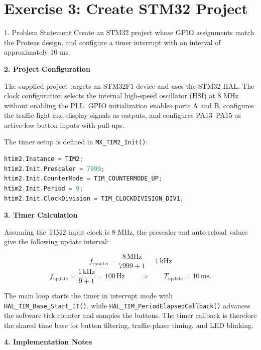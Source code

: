 \clearpage
\section*{Exercise 3: Create STM32 Project}

\begin{questionbox}{1. Problem Statement}
Create an STM32 project whose GPIO assignments match the Proteus design, and configure a timer interrupt with an interval of approximately 10 ms.
\end{questionbox}

\vspace{0.4cm}
\textbf{2. Project Configuration}

The supplied project targets an STM32F1 device and uses the STM32 HAL. The clock configuration selects the internal high-speed oscillator (HSI) at 8 MHz without enabling the PLL. GPIO initialization enables ports A and B, configures the traffic-light and display signals as outputs, and configures PA13--PA15 as active-low button inputs with pull-ups.

The timer setup is defined in \texttt{MX\_TIM2\_Init()}:

\begin{lstlisting}[language=C, caption={TIM2 prescaler and period settings}, label={lst:exercise3_tim2}, captionpos=b]
htim2.Instance = TIM2;
htim2.Init.Prescaler = 7999;
htim2.Init.CounterMode = TIM_COUNTERMODE_UP;
htim2.Init.Period = 9;
htim2.Init.ClockDivision = TIM_CLOCKDIVISION_DIV1;
\end{lstlisting}

\textbf{3. Timer Calculation}

Assuming the TIM2 input clock is 8 MHz, the prescaler and auto-reload values give the following update interval:

\[
 f_{\mathrm{counter}} = \frac{8\,\mathrm{MHz}}{7999+1} = 1\,\mathrm{kHz}
\]
\[
 f_{\mathrm{update}} = \frac{1\,\mathrm{kHz}}{9+1} = 100\,\mathrm{Hz}
 \qquad\Longrightarrow\qquad
 T_{\mathrm{update}} = 10\,\mathrm{ms}.
\]

The main loop starts the timer in interrupt mode with \texttt{HAL\_TIM\_Base\_Start\_IT()}, while \texttt{HAL\_TIM\_PeriodElapsedCallback()} advances the software tick counter and samples the buttons. The timer callback is therefore the shared time base for button filtering, traffic-phase timing, and LED blinking.

\textbf{4. Implementation Notes}

